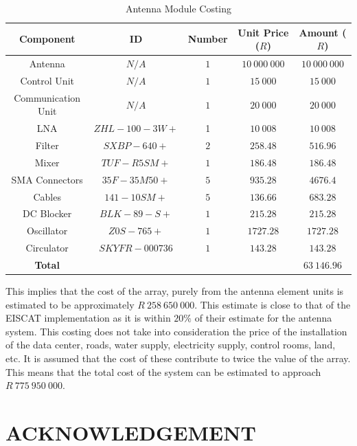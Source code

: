 \documentclass[11pt]{witseiepaper}
\begin{document}
\begin{bibunit}[witseie]
\begin{table}[htb]
    \caption{Antenna Module Costing}
    \label{tab:CostingUnit}
    \begin{center}
        \begin{tabular}{c c c c c}
            \hline 
            Component & ID & Number & Unit Price ($R$) & Amount ($R$) \\
            \hline
            Antenna & $N/A$ & $1$ & $10~000~000$ & $10~000~000$ \\
            Control Unit & $N/A$ & $1$ & $15~000$ & $15~000$ \\
            Communication Unit & $N/A$ & $1$ & $20~000$ & $20~000$ \\

            LNA & $ZHL-100-3W+$ \cite{LNA} & 1 & $10~008$ & $10~008$ \\
            Filter & $SXBP-640+$ \cite{Filter} & $2$ & $258.48$ & $516.96$ \\
            Mixer & $TUF-R5SM+$ \cite{Mixer} & $1$ & $186.48$ & $186.48$ \\
            SMA Connectors & $35F-35M50+$ \cite{SMA} & $5$ & $935.28$ & $4676.4$ \\
            Cables & $141-10SM+$ \cite{Cables} & $5$ & $136.66$ & $683.28$ \\
            DC Blocker & $BLK-89-S+$ \cite{DCBlocker} & $1$ & $215.28$ & $215.28$ \\
            Oscillator & $Z0S-765+$ \cite{Oscillator} & $1$ & $1727.28$ & $1727.28$ \\
            Circulator & $SKYFR-000736$ \cite{Circulator} & $1$ & $143.28$ & $143.28$ \\  
            \hline
            \textbf{Total} & & & & \textbf{$63~146.96$} \\ 
            \hline
        \end{tabular}
    \end{center}
\end{table}
This implies that the cost of the array, purely from the antenna element units is estimated to be approximately $R~258~650~000$. This estimate is close to that of the EISCAT implementation as it is within $20\%$ of their estimate for the antenna system.
This costing does not take into consideration the price of the installation of the data center, roads, water supply, electricity supply, control rooms, land, etc. It is assumed that the cost of these contribute to twice the value of the array.
This means that the total cost of the system can be estimated to approach $R~775~950~000$.

\section*{ACKNOWLEDGEMENT} \label{sec:ACKNOWLEDGEMENT}

% 
% 

\putbib[references]
\end{bibunit}
\end{document}
